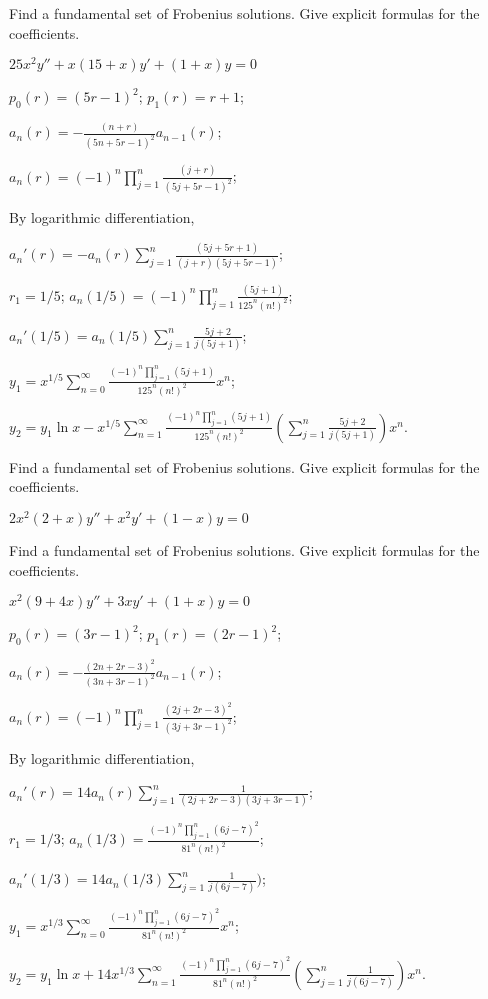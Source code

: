 \documentclass{ximera}
\begin{document}
\begin{problem}\label{exer:7.6.16}
Find a fundamental set of Frobenius  solutions.
Give explicit formulas for the coefficients.

$25x^2y''+x(15+x)y'+(1+x)y=0$

\begin{solution}
    $p_0(r)=(5r-1)^2$;
$p_1(r)=r+1$;

$a_n(r)=-\frac{(n+r)}{(5n+5r-1)^2}
a_{n-1}(r)$;

 $a_n(r)=(-1)^n\prod_{j=1}^n\frac{(j+r)}{(5j+5r-1)^2}$;

By logarithmic differentiation,

$a_n'(r)=-a_n(r)\sum_{j=1}^n\frac{(5j+5r+1)}{(j+r)(5j+5r-1)}$;

$r_1=1/5$;
$a_n(1/5)=(-1)^n\prod_{j=1}^n\frac{(5j+1)}{125^n(n!)^2}$;

$a_n'(1/5)=a_n(1/5)
\sum_{j=1}^n\frac{5j+2}{ j(5j+1)}$;

$y_1=x^{1/5}\sum_{n=0}^\infty\frac{(-1)^n\prod_{j=1}^n(5j+1)}{
125^n(n!)^2} x^n$;

$y_2=
y_1\ln
x-x^{1/5}\sum_{n=1}^\infty\frac{(-1)^n\prod_{j=1}^n(5j+1)}{125^n(n!)^2}
\left(\sum_{j=1}^n\frac{5j+2}{ j(5j+1)}\right)x^n$.
\end{solution}
\end{problem}

\begin{problem}\label{exer:7.6.17}
Find a fundamental set of Frobenius  solutions.
Give explicit formulas for the coefficients.

$2x^2(2+x)y''+x^2y'+(1-x)y=0$
\end{problem}

\begin{problem}\label{exer:7.6.18}
Find a fundamental set of Frobenius  solutions.
Give explicit formulas for the coefficients.

$x^2(9+4x)y''+3xy'+(1+x)y=0$

\begin{solution}
    $p_0(r)=(3r-1)^2$;
$p_1(r)=(2r-1)^2$;

$a_n(r)=-\frac{(2n+2r-3)^2}{(3n+3r-1)^2}a_{n-1}(r)$;

 $a_n(r)=(-1)^n\prod_{j=1}^n\frac{(2j+2r-3)^2}{(3j+3r-1)^2}$;

By logarithmic differentiation,

$a_n'(r)=14 a_n(r)\sum_{j=1}^n\frac{1}{(2j+2r-3)(3j+3r-1)}$;

$r_1=1/3$;
$a_n(1/3)=\frac{(-1)^n\prod_{j=1}^n(6j-7)^2}{81^n(n!)^2}$;

$a_n'(1/3)=14a_n(1/3)
\sum_{j=1}^n\frac{1}{ j(6j-7)})$;

$y_1=x^{1/3}\sum_{n=0}^\infty\frac{(-1)^n\prod_{j=1}^n(6j-7)^2}{
81^n(n!)^2}
x^n$;

$y_2=y_1\ln
x+14x^{1/3}\sum_{n=1}^\infty\frac{(-1)^n\prod_{j=1}^n(6j-7)^2}{
81^n(n!)^2}\left(\sum_{j=1}^n\frac{1}{ j(6j-7)}\right)x^n$.
\end{solution}
\end{problem}
\end{document}
